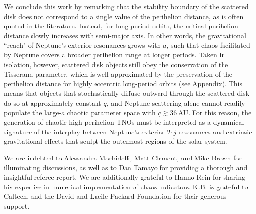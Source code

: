 \documentclass[twocolumn]{aastex62}
\begin{document}
We conclude this work by remarking that the stability boundary of the scattered disk does not correspond to a single value of the perihelion distance, as is often quoted in the literature. Instead, for long-period orbits, the critical perihelion distance slowly increases with semi-major axis. In other words, the gravitational ``reach" of Neptune's exterior resonances grows with $a$, such that chaos facilitated by Neptune covers a broader perihelion range at longer periods. Taken in isolation, however, scattered disk objects still obey the conservation of the Tisserand parameter, which is well approximated by the preservation of the perihelion distance for highly eccentric long-period orbits (see Appendix). This means that objects that stochastically diffuse outward through the scattered disk do so at approximately constant $q$, and Neptune scattering alone cannot readily populate the large-$a$ chaotic parameter space with $q\gtrsim36\,$AU. For this reason, the generation of chaotic high-perihelion TNOs must be interpreted as a dynamical signature of the interplay between Neptune's exterior $2:j$ resonances and extrinsic gravitational effects that sculpt the outermost regions of the solar system.




\begin{acknowledgments}
We are indebted to Alessandro Morbidelli, Matt Clement, and Mike Brown for illuminating discussions, as well as to Dan Tamayo for providing a thorough and insightful referee report. We are additionally grateful to Hanno Rein for sharing his expertise in numerical implementation of chaos indicators. K.B. is grateful to Caltech, and the David and Lucile Packard Foundation for their generous support. 
\end{acknowledgments}
\end{document}
